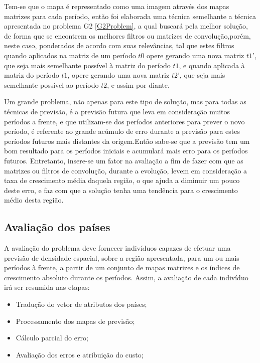 Tem-se que o mapa é representado como uma imagem através dos mapas matrizes para cada período, então foi elaborada uma técnica  semelhante a técnica apresentada no problema G2 \ref{G2Problem}, a qual buscará pela melhor solução, de forma que se encontrem os melhores filtros ou matrizes de convolução,porém, neste caso,  ponderados de acordo com suas relevâncias, tal que estes filtros quando aplicados na matriz de um período \(t0\) opere gerando uma nova matriz \(t1’\), que seja mais semelhante possível à matriz do período \(t1\), e quando aplicada à matriz do período \(t1\), opere gerando uma nova matriz \(t2’\), que seja mais semelhante possível ao período \(t2\), e assim por diante.

Um grande problema, não apenas para este tipo de solução, mas para todas as técnicas de previsão, é a previsão futura que leva em consideração muitos períodos a frente, e que utilizam-se dos períodos anteriores para prever o novo período, é  referente ao grande acúmulo de erro durante a previsão para estes períodos futuros mais distantes da origem.Então sabe-se que a previsão tem um bom resultado para os períodos iniciais e acumulará mais erro para os períodos futuros. Entretanto, insere-se um fator na avaliação a fim de fazer com que as matrizes ou filtros de convolução, durante a evolução, levem em consideração a taxa de crescimento média daquela região, o que ajuda a diminuir um pouco deste erro, e faz com que a solução tenha uma tendência para o crescimento médio desta região.


\subsection{Avaliação dos países}

A avaliação do problema deve fornecer indivíduos capazes de efetuar uma previsão de densidade espacial, sobre a região apresentada, para um ou mais períodos à frente, a partir de um conjunto de mapas matrizes e os índices de crescimento absoluto durante os períodos. Assim, a avaliação de cada indivíduo irá ser resumida nas etapas:
\begin{itemize}
\item Tradução do vetor de atributos dos países;
\item Processamento dos mapas de previsão; 
\item Cálculo parcial do erro;
\item Avaliação dos erros e atribuição do custo;
\end{itemize}

